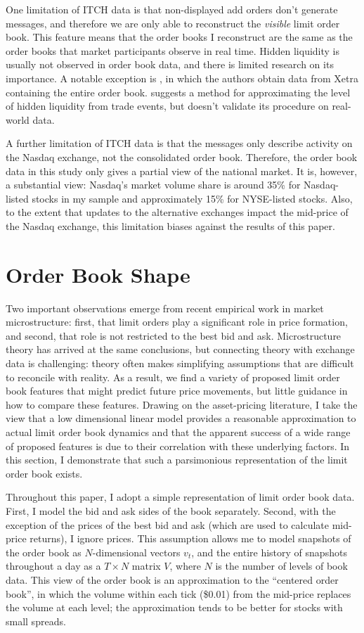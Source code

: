 	One limitation of ITCH data is that non-displayed add orders don't generate messages, and therefore we are only able to reconstruct the \textit{visible} limit order book. This feature means that the order books I reconstruct are the same as the order books that market participants observe in real time. Hidden liquidity is usually not observed in order book data, and there is limited research on its importance. A notable exception is \citet{Beltran-Lopez2009}, in which the authors obtain data from Xetra containing the entire order book. \citet{Avellaneda2011} suggests a method for approximating the level of hidden liquidity from trade events, but doesn't validate its procedure on real-world data.

	A further limitation of ITCH data is that the messages only describe activity on the Nasdaq exchange, not the consolidated order book. Therefore, the order book data in this study only gives a partial view of the national market. It is, however, a substantial view: Nasdaq's market volume share is around 35\% for Nasdaq-listed stocks in my sample and approximately 15\% for NYSE-listed stocks. Also, to the extent that updates to the alternative exchanges impact the mid-price of the Nasdaq exchange, this limitation biases against the results of this paper.


\section{Order Book Shape}
	Two important observations emerge from recent empirical work in market microstructure: first, that limit orders play a significant role in price formation, and second, that role is not restricted to the best bid and ask. Microstructure theory has arrived at the same conclusions, but connecting theory with exchange data is challenging: theory often makes simplifying assumptions that are difficult to reconcile with reality. As a result, we find a variety of proposed limit order book features that might predict future price movements, but little guidance in how to compare these features. Drawing on the asset-pricing literature, I take the view that a low dimensional linear model provides a reasonable approximation to actual limit order book dynamics and that the apparent success of a wide range of proposed features is due to their correlation with these underlying factors. In this section, I demonstrate that such a parsimonious representation of the limit order book exists.

	Throughout this paper, I adopt a simple representation of limit order book data. First, I model the bid and ask sides of the book separately. Second, with the exception of the prices of the best bid and ask (which are used to calculate mid-price returns), I ignore prices. This assumption allows me to model snapshots of the order book as $N$-dimensional vectors $v_t$, and the entire history of snapshots throughout a day as a $T \times N$ matrix $V$, where $N$ is the number of levels of book data. This view of the order book is an approximation to the ``centered order book'', in which the volume within each tick (\$0.01) from the mid-price replaces the volume at each level; the approximation tends to be better for stocks with small spreads.

